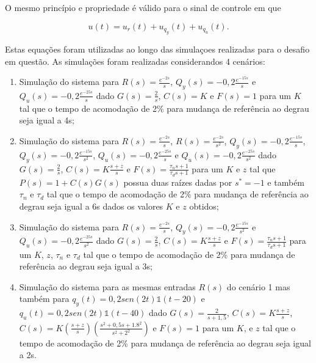 O mesmo princípio e propriedade é válido para o sinal de controle em que

\begin{equation}
    \label{eq:sinal-de-controle}
    u(t) = u_{r}(t) + u_{q_{y}}(t) + u_{q_{u}}(t).
\end{equation}

Estas equações foram utilizadas ao longo das simulaçoes realizadas para o
desafio em questão. As simulações foram realizadas considerandos 4 cenários:
\begin{enumerate}
    \item Simulação do sistema para $R(s) = \frac{e^{-2s}}{s}$,
    $Q_{y}(s) = -0,2\frac{e^{-15s}}{s}$ e $Q_{u}(s) = -0,2\frac{e^{-25s}}{s}$
    dado $G(s) = \frac{2}{s}$, $C(s) = K$ e $F(s) = 1$ para um $K$ tal que o
    tempo de acomodação de 2\% para mudança de referência ao degrau seja igual
    a 4s;

    \item Simulação do sistema para $R(s) = \frac{e^{-2s}}{s}$,
    $R(s) = \frac{e^{-2s}}{s^{2}}$, $Q_{y}(s) = -0,2\frac{e^{-15s}}{s}$,
    $Q_{y}(s) = -0,2\frac{e^{-15s}}{s^{2}}$, $Q_{u}(s) = -0,2\frac{e^{-25s}}{s}$
    e $Q_{u}(s) = -0,2\frac{e^{-25s}}{s^{2}}$ dado $G(s) = \frac{2}{s}$, 
    $C(s) = K\frac{s + z}{s}$ e $F(s) = \frac{\tau_{n}s + 1}{\tau_{d}s + 1}$ 
    para um $K$ e $z$ tal que $P(s) = 1 + C(s)G(s)$ possua duas raízes dadas 
    por $s^{*} = -1$ e também $\tau_{n}$ e $\tau_{d}$ tal que o tempo de
    acomodação de 2\% para mudança de referência ao degrau seja igual a 6s
    dados os valores $K$ e $z$ obtidos;

    \item Simulação do sistema para $R(s) = \frac{e^{-2s}}{s}$,
    $Q_{y}(s) = -0,2\frac{e^{-15s}}{s^{2}}$ e
    $Q_{u}(s) = -0,2\frac{e^{-25s}}{s^{2}}$ dado $G(s) = \frac{2}{s}$,
    $C(s) = K\frac{s + z}{s}$ e $F(s) = \frac{\tau_{n}s + 1}{\tau_{d}s + 1}$ 
    para um $K$, $z$, $\tau_{n}$ e $\tau_{d}$ tal que o tempo de acomodação de
    2\% para mudança de referência ao degrau seja igual a 3s;

    \item Simulação do sistema para as mesmas entradas $R(s)$ do cenário 1 mas 
    também para $q_{y}(t) = 0,2sen(2t)\mathds{1}(t - 20)$ e 
    $q_{u}(t) = 0,2sen(2t)\mathds{1}(t - 40)$ dado $G(s) = \frac{2}{s + 1,5}$, 
    $C(s) = K\frac{s + z}{s}$, 
    $C(s) = K\left(\frac{s + z}{s}\right)\left(\frac{s^2 + 0,5s + 1.8^2}{s^2 + 2^2}\right)$ 
    e $F(s) = 1$ para um $K$, e $z$ tal que o tempo de acomodação de 2\% para 
    mudança de referência ao degrau seja igual a 2s.
\end{enumerate}

